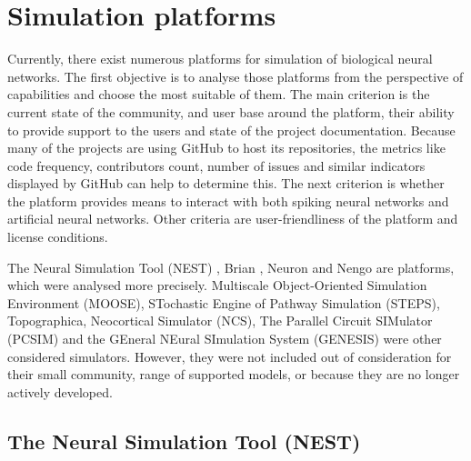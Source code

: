 \chapter{Simulation platforms} \label{chap:03}

Currently, there exist numerous platforms for simulation of biological neural networks. The first objective is to analyse those platforms from the perspective of capabilities and choose the most suitable of them. The main criterion is the current state of the community, and user base around the platform, their ability to provide support to the users and state of the project documentation. Because many of the projects are using GitHub to host its repositories, the metrics like code frequency, contributors count, number of issues and similar indicators displayed by GitHub can help to determine this. The next criterion is whether the platform provides means to interact with both spiking neural networks and artificial neural networks. Other criteria are user-friendliness of the platform and license conditions. \par
The Neural Simulation Tool (NEST) \cite{jordanNEST182019}, Brian \cite{stimbergBrianIntuitiveEfficient2019}, Neuron \cite{carnevaleNEURONBook06} and Nengo \cite{bekolayNengoPythonTool2014} are platforms, which were analysed more precisely. Multiscale Object-Oriented Simulation Environment (MOOSE), STochastic Engine of Pathway Simulation (STEPS), Topographica, Neocortical Simulator (NCS), The Parallel Circuit SIMulator (PCSIM) and the GEneral NEural SImulation System (GENESIS) were other considered simulators. However, they were not included out of consideration for their small community, range of supported models, or because they are no longer actively developed.

\section{The Neural Simulation Tool (NEST)}

